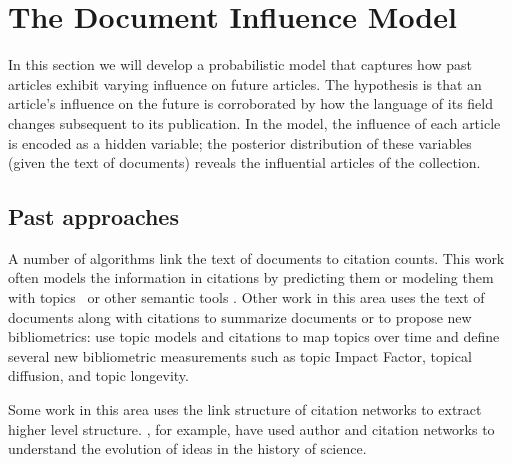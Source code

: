 \section{The Document Influence Model}
\label{section:model}

In this section we will develop a probabilistic model that captures
how past articles exhibit varying influence on future articles.  The
hypothesis is that an article's influence on the future is
corroborated by how the language of its field changes subsequent to
its publication.  In the model, the influence of each article is
encoded as a hidden variable; the posterior distribution of these
variables (given the text of documents) reveals the influential articles
of the collection.

\subsection*{Past approaches}
A number of algorithms link the text of documents to citation counts.
This work often models the information in citations by predicting them
or modeling them with
topics~\citep{nallapati:2008,chang:2009,dietz:2007,Cohn01themissing} or
other semantic tools \citep{mcnee:2002,ibanez:2009}.  Other work in
this area uses the text of documents along with citations to summarize
documents \citep{qazvinian:2008} or to propose new bibliometrics:
\cite{mann:2006} use topic models and citations to map topics over
time and define several new bibliometric measurements such as topic
Impact Factor, topical diffusion, and topic longevity.

Some work in this area uses the link structure of citation networks to
extract higher level structure. \cite{borner:2003}, for
example, have used author and citation networks to understand the
evolution of ideas in the history of science.

